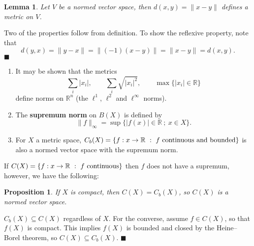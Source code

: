 \documentclass[letter-paper]{tufte-book}
\newtheorem{lemma}[theorem]{\color{pastel-blue}Lemma}
\newtheorem{proposition}[theorem]{\color{pastel-blue}Proposition}
\newenvironment{proof}[1][Proof]{\begin{trivlist}
\item[\hskip \labelsep {\bfseries #1}]}{\end{trivlist}}
\newenvironment{example}[1][Example]{\begin{trivlist}
\item[\hskip \labelsep {\bfseries #1}]}{\end{trivlist}}
\newcommand{\qed}{\hfill$\blacksquare$}
\begin{document}
\begin{lemma}
  Let $V$ be a normed vector space, then $d(x, y) = \|x - y\|$ defines a metric
  on $V$.
\end{lemma}

\begin{proof}
  Two of the properties follow from definition. To show the reflexive property,
  note that
  \begin{equation*}
    d(y, x) = \| y - x \| = \| (-1)(x - y)\| = \| x - y \| = d(x, y).
  \end{equation*}
  \qed
\end{proof}

\begin{example}
  \begin{enumerate}
    \item It may be shown that the metrics
    \begin{equation*}
      \sum_i |x_i|, \qquad \sum_i \sqrt{|x_i|^2}, \qquad
      \max \{|x_i| \in \mathbb{R}\}
    \end{equation*}
    define norms on $\mathbb{R}^n$ (the $\ell^1$, $\ell^2$ and $\ell^\infty$
    norms).
    
    \item The \textbf{supremum norm} on $B(X)$ is defined by
    \begin{equation*}
      \|f\|_{\infty} = \sup\{ |f(x)|\in \mathbb{R}\ ;\ x\in X\}.
    \end{equation*}
    
    \item For $X$ a metric space, $C_b (X) = \{f : x \to \mathbb{R}\ : \ f\
    \textnormal{continuous and bounded}\}$ is also a normed vector space with
    the supremum norm.
  \end{enumerate}
\end{example}

If $C(X) = \{f : x \to \mathbb{R}\ : \ f\ \textnormal{continuous}\}$ then $f$
does not have a supremum, however, we have the following:
\begin{proposition}
  If $X$ is compact, then $C(X) = C_b(X)$, so $C(X)$ is a normed vector space.
\end{proposition}

\begin{proof}
  $C_b(X) \subseteq C(X)$ regardless of $X$. For the converse, assume $f \in
  C(X)$, so that $f(X)$ is compact. This implies $f(X)$ is bounded and closed by
  the Heine--Borel theorem, so $C(X) \subseteq C_b(X)$. \qed
\end{proof}
\end{document}
